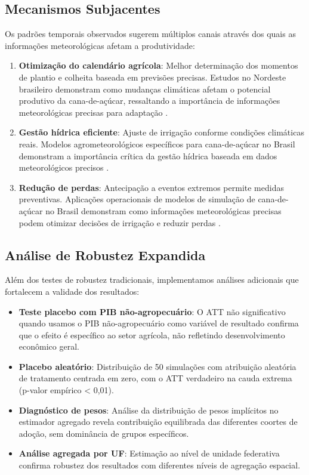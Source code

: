 \documentclass[
	12pt,				%
	oneside,			%
	a4paper,			%
	english,			%
	french,				%
	spanish,			%
	brazil				%
	]{abntex2}
\begin{document}
\subsection{Mecanismos Subjacentes}

Os padrões temporais observados sugerem múltiplos canais através dos quais as informações meteorológicas afetam a produtividade:

\begin{enumerate}
\item \textbf{Otimização do calendário agrícola}: Melhor determinação dos momentos de plantio e colheita baseada em previsões precisas. Estudos no Nordeste brasileiro demonstram como mudanças climáticas afetam o potencial produtivo da cana-de-açúcar, ressaltando a importância de informações meteorológicas precisas para adaptação \cite{carvalho2019}.

\item \textbf{Gestão hídrica eficiente}: Ajuste de irrigação conforme condições climáticas reais. Modelos agrometeorológicos específicos para cana-de-açúcar no Brasil demonstram a importância crítica da gestão hídrica baseada em dados meteorológicos precisos \cite{monteiro2017, marin2016}.

\item \textbf{Redução de perdas}: Antecipação a eventos extremos permite medidas preventivas. Aplicações operacionais de modelos de simulação de cana-de-açúcar no Brasil demonstram como informações meteorológicas precisas podem otimizar decisões de irrigação e reduzir perdas \cite{vianna2020}.

\end{enumerate}


\subsection{Análise de Robustez Expandida}

Além dos testes de robustez tradicionais, implementamos análises adicionais que fortalecem a validade dos resultados:

\begin{itemize}
\item \textbf{Teste placebo com PIB não-agropecuário}: O ATT não significativo quando usamos o PIB não-agropecuário como variável de resultado confirma que o efeito é específico ao setor agrícola, não refletindo desenvolvimento econômico geral.

\item \textbf{Placebo aleatório}: Distribuição de 50 simulações com atribuição aleatória de tratamento centrada em zero, com o ATT verdadeiro na cauda extrema (p-valor empírico < 0,01).

\item \textbf{Diagnóstico de pesos}: Análise da distribuição de pesos implícitos no estimador agregado revela contribuição equilibrada das diferentes coortes de adoção, sem dominância de grupos específicos.

\item \textbf{Análise agregada por UF}: Estimação ao nível de unidade federativa confirma robustez dos resultados com diferentes níveis de agregação espacial.
\end{itemize}
\end{document}
